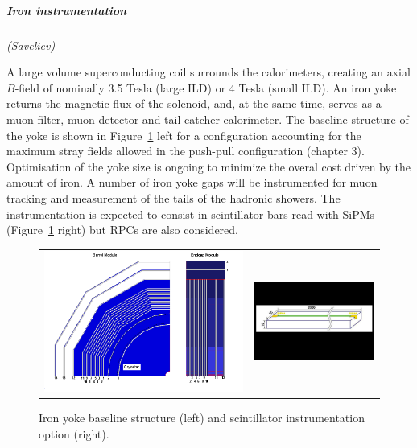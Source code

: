 \vspace{1cm}
\subparagraph*{\bf Iron instrumentation}
\textit{(Saveliev)}

A large volume superconducting coil surrounds the calorimeters, creating an axial $B$-field of nominally 3.5 Tesla (large ILD) or 4 Tesla (small ILD). An iron yoke returns the magnetic flux of the solenoid, and, at the same time, serves as a muon filter, muon detector and tail catcher calorimeter. The baseline structure of the yoke is shown in Figure~\ref{fig:det:yoke} left for a configuration accounting for the maximum stray fields allowed in the push-pull configuration (chapter 3). Optimisation of the yoke size is ongoing to minimize the overal cost driven by the amount of iron. A number of iron yoke gaps will be instrumented for muon tracking and measurement of the tails of the hadronic showers. The instrumentation is expected to consist in scintillator bars read with SiPMs (Figure~\ref{fig:det:yoke} right) but RPCs are also considered.   

\begin{figure}[t!]
\begin{tabular}{cc}
\includegraphics[width=0.5\hsize,viewport={0 -10 600 500},clip]{Detector/fig/yoke_layout.png} &
\includegraphics[width=0.4\hsize]{Detector/fig/muon_layer.png}
\end{tabular}
\caption{Iron yoke baseline structure (left) and scintillator instrumentation option (right).}
\label{fig:det:yoke}
\end{figure}

\newpage
